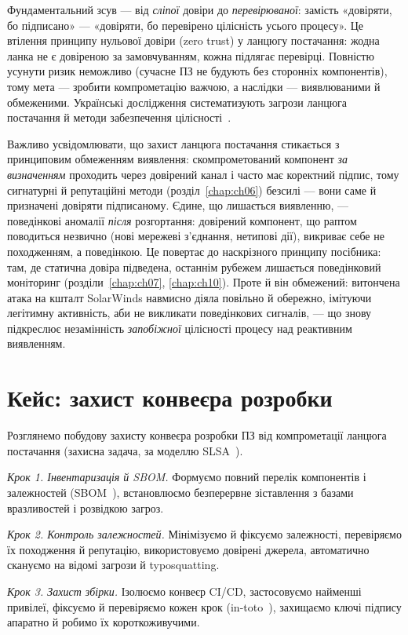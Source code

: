 Фундаментальний зсув --- від \emph{сліпої} довіри до \emph{перевірюваної}: замість «довіряти, бо підписано» --- «довіряти, бо перевірено цілісність усього процесу». Це втілення принципу нульової довіри (zero trust) у ланцюгу постачання: жодна ланка не є довіреною за замовчуванням, кожна підлягає перевірці. Повністю усунути ризик неможливо (сучасне ПЗ не будують без сторонніх компонентів), тому мета --- зробити компрометацію важчою, а наслідки --- виявлюваними й обмеженими. Українські дослідження систематизують загрози ланцюга постачання й методи забезпечення цілісності~\cite{ch15:supplychain-ua}.

Важливо усвідомлювати, що захист ланцюга постачання стикається з принциповим обмеженням виявлення: скомпрометований компонент \emph{за визначенням} проходить через довірений канал і часто має коректний підпис, тому сигнатурні й репутаційні методи (розділ~\ref{chap:ch06}) безсилі --- вони саме й призначені довіряти підписаному. Єдине, що лишається виявленню, --- поведінкові аномалії \emph{після} розгортання: довірений компонент, що раптом поводиться незвично (нові мережеві з'єднання, нетипові дії), викриває себе не походженням, а поведінкою. Це повертає до наскрізного принципу посібника: там, де статична довіра підведена, останнім рубежем лишається поведінковий моніторинг (розділи~\ref{chap:ch07}, \ref{chap:ch10}). Проте й він обмежений: витончена атака на кшталт SolarWinds навмисно діяла повільно й обережно, імітуючи легітимну активність, аби не викликати поведінкових сигналів, --- що знову підкреслює незамінність \emph{запобіжної} цілісності процесу над реактивним виявленням.

\section{Кейс: захист конвеєра розробки}\label{sec:ch15-case}

Розглянемо побудову захисту конвеєра розробки ПЗ від компрометації ланцюга постачання (захисна задача, за моделлю SLSA~\cite{ch15:slsa}).

\emph{Крок 1. Інвентаризація й SBOM.} Формуємо повний перелік компонентів і залежностей (SBOM~\cite{ch15:sbom}), встановлюємо безперервне зіставлення з базами вразливостей і розвідкою загроз.

\emph{Крок 2. Контроль залежностей.} Мінімізуємо й фіксуємо залежності, перевіряємо їх походження й репутацію, використовуємо довірені джерела, автоматично скануємо на відомі загрози й typosquatting.

\emph{Крок 3. Захист збірки.} Ізолюємо конвеєр CI/CD, застосовуємо найменші привілеї, фіксуємо й перевіряємо кожен крок (in-toto~\cite{ch15:intoto}), захищаємо ключі підпису апаратно й робимо їх короткоживучими.

